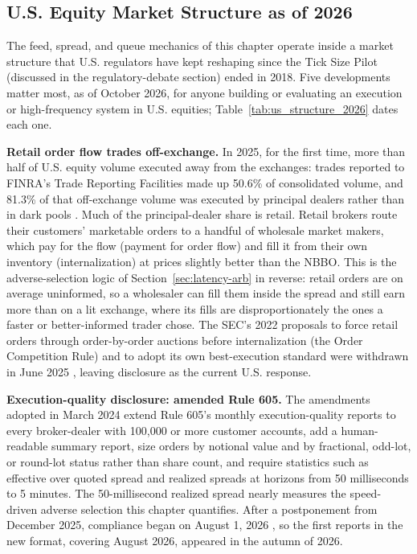 \documentclass[../ai_in_finance]{subfiles}
\begin{document}
\subsection{U.S. Equity Market Structure as of 2026}
\label{sec:us-structure-2026}

The feed, spread, and queue mechanics of this chapter operate inside a market structure that U.S. regulators have kept reshaping since the Tick Size Pilot (discussed in the regulatory-debate section) ended in 2018. Five developments matter most, as of October 2026, for anyone building or evaluating an execution or high-frequency system in U.S. equities; Table~\ref{tab:us_structure_2026} dates each one.

\textbf{Retail order flow trades off-exchange.} In 2025, for the first time, more than half of U.S. equity volume executed away from the exchanges: trades reported to FINRA's Trade Reporting Facilities made up 50.6\% of consolidated volume, and 81.3\% of that off-exchange volume was executed by principal dealers rather than in dark pools \parencite{cboe2026review}. Much of the principal-dealer share is retail. Retail brokers route their customers' marketable orders to a handful of wholesale market makers, which pay for the flow (payment for order flow) and fill it from their own inventory (internalization) at prices slightly better than the NBBO. This is the adverse-selection logic of Section~\ref{sec:latency-arb} in reverse: retail orders are on average uninformed, so a wholesaler can fill them inside the spread and still earn more than on a lit exchange, where its fills are disproportionately the ones a faster or better-informed trader chose. The SEC's 2022 proposals to force retail orders through order-by-order auctions before internalization (the Order Competition Rule) and to adopt its own best-execution standard were withdrawn in June 2025 \parencite{sec2025withdrawal}, leaving disclosure as the current U.S. response.

\textbf{Execution-quality disclosure: amended Rule 605.} The amendments adopted in March 2024 \parencite{sec2024rule605} extend Rule 605's monthly execution-quality reports to every broker-dealer with 100,000 or more customer accounts, add a human-readable summary report, size orders by notional value and by fractional, odd-lot, or round-lot status rather than share count, and require statistics such as effective over quoted spread and realized spreads at horizons from 50 milliseconds to 5 minutes. The 50-millisecond realized spread nearly measures the speed-driven adverse selection this chapter quantifies. After a postponement from December 2025, compliance began on August 1, 2026 \parencite{sec2025rule605ext}, so the first reports in the new format, covering August 2026, appeared in the autumn of 2026.
\end{document}
